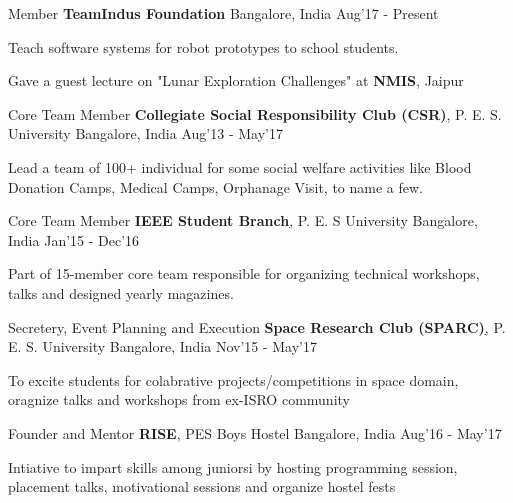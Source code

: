 \begin{cventries}
	\cventry
	{Member}
	{\textbf{TeamIndus Foundation}}
	{Bangalore, India}
	{Aug'17 - Present}
	{
		\begin{cvitems}
		\item{Teach software systems for robot prototypes to school students.}
		\item{Gave a guest lecture on "Lunar Exploration Challenges" at \textbf{NMIS}, Jaipur}
		\end{cvitems}
	}

	\cventry
	{Core Team Member}
	{\textbf{Collegiate Social Responsibility Club (CSR)}\href{http://pes.edu/clubs/pes-csr-club/}, P. E. S. University}
	{Bangalore, India}
	{Aug'13 - May'17}
	{
		\begin{cvitems}
		\item{Lead a team of 100+ individual for some social welfare activities like Blood Donation Camps, Medical Camps, Orphanage Visit, to name a few.}
		\end{cvitems}
	}

	\cventry
	{Core Team Member}
	{\textbf{IEEE Student Branch}\href{http://ieee.pes.edu/}, P. E. S University}
	{Bangalore, India}
	{Jan'15 - Dec'16}
	{
		\begin{cvitems}
		\item{Part of 15-member core team responsible for organizing technical workshops, talks and designed yearly magazines.}
		\end{cvitems}
	}

	\cventry
	{Secretery, Event Planning and Execution}
	{\textbf{Space Research Club (SPARC)}\href{https://www.facebook.com/Space-Research-Club-Of-PES-University-487153011445398/?tn-str=k*F}, P. E. S. University}
	{Bangalore, India}
	{Nov'15 - May'17}
	{
		\begin{cvitems}
		\item{To excite students for colabrative projects/competitions in space domain, oragnize talks and workshops from ex-ISRO community}
		\end{cvitems}
	}

	\cventry
	{Founder and Mentor}
	{\textbf{RISE}, PES Boys Hostel}
	{Bangalore, India}
	{Aug'16 - May'17}
	{
		\begin{cvitems}
		\item{Intiative to impart skills among juniorsi by hosting programming session, placement talks, motivational sessions and organize hostel fests}
		\end{cvitems}
	}


\end{cventries}
